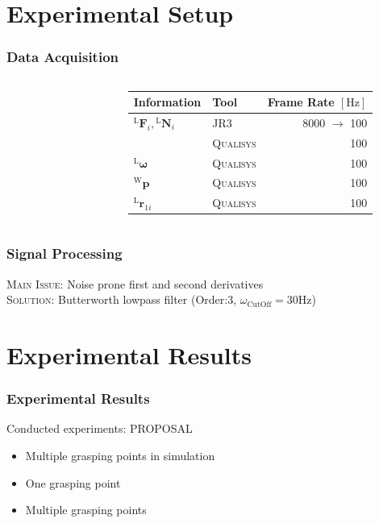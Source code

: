 \documentclass[student,noshadow]{ITRslides}
\renewcommand{\vec}[1]{\boldsymbol{#1}}
\renewcommand{\vec}[1]{\boldsymbol{#1}}
\newcommand{\scr}[1]{\mathrm{#1}}
\begin{document}
\section{Experimental Setup}
\begin{frame}
	\frametitle{Data Acquisition}
	\begin{columns}
	\begin{column}{0.35\textwidth}
				\begin{figure}
					\centering
					
				\end{figure}	
		 	\end{column}
		 	\begin{column}{0.65\textwidth}
		 	\begin{tabular}{llr}
				\toprule
				Information    & Tool & Frame Rate $\left[\mathrm{Hz}\right]$ \\
				\midrule
				${^\scr{L}}\vec{F}_{i},{^\scr{L}}\vec{N}_{i}$      & \textsc{JR3}    & 8000 $\rightarrow$ 100      \\
				          & \textsc{Qualisys}        & 100       \\
				$^\scr{L}\vec{\omega}$       & \textsc{Qualisys}     & 100      \\
				$^\scr{W}\vec{p}$       & \textsc{Qualisys}     & 100      \\
				$^\scr{L}\vec{r}_{1i}$ & \textsc{Qualisys}      & 100       \\
				\bottomrule
			\end{tabular}
		 	\end{column}
	\end{columns}
\end{frame}

\begin{frame}
	\frametitle{Signal Processing}
	
	\textsc{Main Issue}: Noise prone first and second derivatives\\
	\textsc{Solution}: Butterworth lowpass filter (Order:3, $\omega_\mathrm{CutOff} = 30 \mathrm{Hz}$)
	\begin{figure}
		\centering
		
	\end{figure}	
\end{frame}

\section{Experimental Results}

\begin{frame}
	\frametitle{Experimental Results}
	Conducted experiments: PROPOSAL
	\begin{itemize}
		\item Multiple grasping points in simulation
		\item One grasping point
		\item Multiple grasping points
	\end{itemize}
\end{frame}
\end{document}
